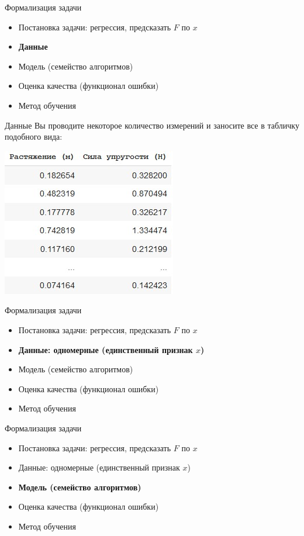 \documentclass[aspectratio=169]{beamer}
\begin{document}
\begin{frame}{Формализация задачи}
    \begin{itemize}
        \item Постановка задачи: регрессия, предсказать \( F \) по \( x \)
        \item \textbf{Данные}
        \item Модель (семейство алгоритмов)
        \item Оценка качества (функционал ошибки)
        \item Метод обучения
    \end{itemize}
\end{frame}

\begin{frame}{Данные}
    Вы проводите некоторое количество измерений и заносите все в табличку подобного вида:
    \begin{center}
        \includegraphics[width=.42\linewidth]{graphs/fig3.jpg}
    \end{center}
\end{frame}

\begin{frame}{Формализация задачи}
    \begin{itemize}
        \item Постановка задачи: регрессия, предсказать \( F \) по \( x \)
        \item \textbf{Данные: одномерные (единственный признак \( x \))}
        \item Модель (семейство алгоритмов)
        \item Оценка качества (функционал ошибки)
        \item Метод обучения
    \end{itemize}
\end{frame}

\begin{frame}{Формализация задачи}
    \begin{itemize}
        \item Постановка задачи: регрессия, предсказать \( F \) по \( x \)
        \item Данные: одномерные (единственный признак \( x \))
        \item \textbf{Модель (семейство алгоритмов)}
        \item Оценка качества (функционал ошибки)
        \item Метод обучения
    \end{itemize}
\end{frame}
\end{document}
